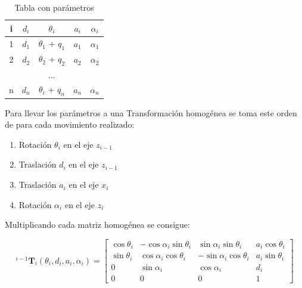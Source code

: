 \begin{table}[H]
    \begin{center}
        \begin{tabular}{| c | c | c | c | c |}
            \hline
            i & $d_i$ & $\theta_i$         & $a_i$ & $\alpha_i$ \\ \hline
            1 & $d_1$ & $\theta_1$ + $q_1$ & $a_1$ & $\alpha_1$ \\ \hline
            2 & $d_2$ & $\theta_2$ + $q_2$ & $a_2$ & $\alpha_2$ \\ \hline
              &       & ...                &       &            \\ \hline
            n & $d_n$ & $\theta_i$ + $q_n$ & $a_n$ & $\alpha_n$ \\ \hline
        \end{tabular}
        \caption{Tabla con parámetros}
        \label{tab:DH}
    \end{center}
\end{table}

Para llevar los parámetros a una Transformación homogénea se toma este
orden de para cada movimiento realizado:
\begin{enumerate}
    \item Rotación $\theta_i$ en el eje $z_{i-1}$
    \item Traslación $d_i$ en el eje $z_{i-1}$
    \item Traslación $a_i$ en el eje $x_{i}$
    \item Rotación $\alpha_i$ en el eje $z_{i}$
\end{enumerate}
Multiplicando cada matriz homogénea se consigue:

\begin{equation*}
    ^{i-1}\boldsymbol{T}_{i}(\theta_i,d_i,a_i,\alpha_i)=
    \begin{bmatrix}
        \cos{\theta_i} & -\cos{\alpha_i}\sin{\theta_i}
                       & \sin{\alpha_i}\sin{\theta_i}  & a_i\cos{\theta_i}       \\
        \sin{\theta_i} & \cos{\alpha_i}\cos{\theta_i}
                       & -\sin{\alpha_i}\cos{\theta_i} & a_i\sin{\theta_i}       \\
        0              & \sin{\alpha_i}                & \cos{\alpha_i}    & d_i \\
        0              & 0                             & 0                 & 1
    \end{bmatrix}
\end{equation*}

